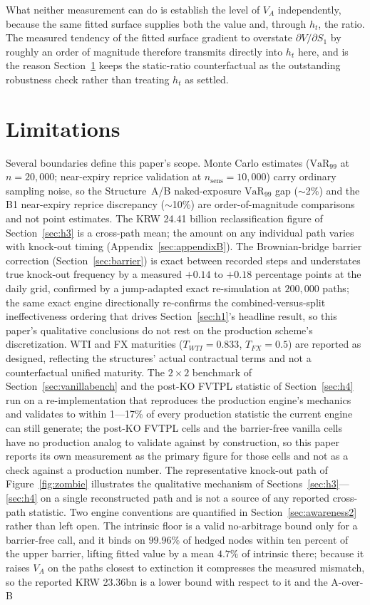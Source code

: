 \documentclass[11pt,a4paper]{article}
\begin{document}
What neither measurement can do is establish the level of $V_A$ independently, because the same fitted surface supplies both the value and, through $h_t$, the ratio. The measured tendency of the fitted surface gradient to overstate $\partial V/\partial S_1$ by roughly an order of magnitude therefore transmits directly into $h_t$ here, and is the reason Section~\ref{sec:limitations} keeps the static-ratio counterfactual as the outstanding robustness check rather than treating $h_t$ as settled.

\section{Limitations}
\label{sec:limitations}

Several boundaries define this paper's scope. Monte Carlo estimates ($\mathrm{VaR}_{99}$ at $n=20{,}000$; near-expiry reprice validation at $n_{\mathrm{sens}}=10{,}000$) carry ordinary sampling noise, so the Structure~A/B naked-exposure $\mathrm{VaR}_{99}$ gap ($\sim$2\%) and the B1 near-expiry reprice discrepancy ($\sim$10\%) are order-of-magnitude comparisons and not point estimates. The KRW 24.41 billion reclassification figure of Section~\ref{sec:h3} is a cross-path mean; the amount on any individual path varies with knock-out timing (Appendix~\ref{sec:appendixB}). The Brownian-bridge barrier correction (Section~\ref{sec:barrier}) is exact between recorded steps and understates true knock-out frequency by a measured $+0.14$ to $+0.18$ percentage points at the daily grid, confirmed by a jump-adapted exact re-simulation at $200{,}000$ paths; the same exact engine directionally re-confirms the combined-versus-split ineffectiveness ordering that drives Section~\ref{sec:h1}'s headline result, so this paper's qualitative conclusions do not rest on the production scheme's discretization. WTI and FX maturities ($T_{WTI}=0.833$, $T_{FX}=0.5$) are reported as designed, reflecting the structures' actual contractual terms and not a counterfactual unified maturity. The $2\times2$ benchmark of Section~\ref{sec:vanillabench} and the post-KO FVTPL statistic of Section~\ref{sec:h4} run on a re-implementation that reproduces the production engine's mechanics and validates to within 1---17\% of every production statistic the current engine can still generate; the post-KO FVTPL cells and the barrier-free vanilla cells have no production analog to validate against by construction, so this paper reports its own measurement as the primary figure for those cells and not as a check against a production number. The representative knock-out path of Figure~\ref{fig:zombie} illustrates the qualitative mechanism of Sections~\ref{sec:h3}---\ref{sec:h4} on a single reconstructed path and is not a source of any reported cross-path statistic. Two engine conventions are quantified in Section~\ref{sec:awareness2} rather than left open. The intrinsic floor is a valid no-arbitrage bound only for a barrier-free call, and it binds on $99.96\%$ of hedged nodes within ten percent of the upper barrier, lifting fitted value by a mean $4.7\%$ of intrinsic there; because it raises $V_A$ on the paths closest to extinction it compresses the measured mismatch, so the reported KRW 23.36bn is a lower bound with respect to it and the A-over-B 
\end{document}

